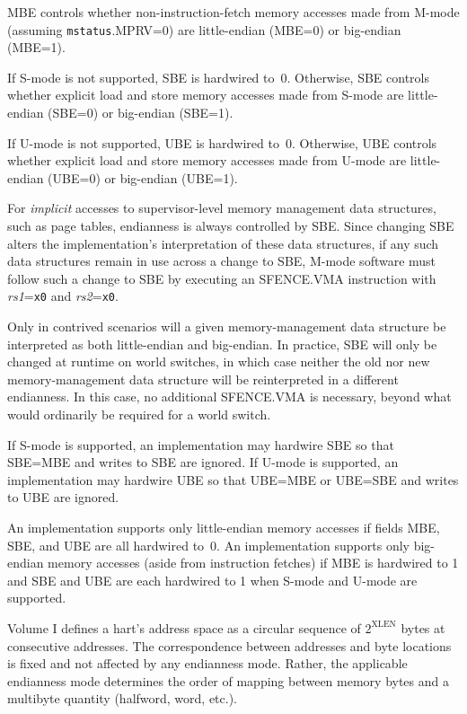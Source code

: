 MBE controls whether non-instruction-fetch memory accesses made from
M-mode (assuming {\tt mstatus}.MPRV=0) are little-endian (MBE=0) or
big-endian (MBE=1).

If S-mode is not supported, SBE is hardwired to~0.
Otherwise, SBE controls whether explicit load and store memory accesses made
from S-mode are little-endian (SBE=0) or big-endian (SBE=1).

If U-mode is not supported, UBE is hardwired to~0.
Otherwise, UBE controls whether explicit load and store memory accesses made
from U-mode are little-endian (UBE=0) or big-endian (UBE=1).

For {\em implicit} accesses to supervisor-level memory management data
structures, such as page tables, endianness is always controlled by SBE.
Since changing SBE alters the implementation's interpretation of these data
structures, if any such data structures remain in use across a change to SBE,
M-mode software must follow such a change to SBE by executing an
SFENCE.VMA instruction with {\em rs1}={\tt x0} and {\em rs2}={\tt x0}.

\begin{commentary}
Only in contrived scenarios will a given memory-management data structure be
interpreted as both little-endian and big-endian.
In practice, SBE will only be changed at runtime on world switches, in which
case neither the old nor new memory-management data structure will be
reinterpreted in a different endianness.
In this case, no additional SFENCE.VMA is necessary, beyond what would
ordinarily be required for a world switch.
\end{commentary}

If S-mode is supported, an implementation may hardwire SBE so that
SBE=MBE and writes to SBE are ignored.
If U-mode is supported, an implementation may hardwire UBE so that
UBE=MBE or UBE=SBE and writes to UBE are ignored.

\begin{commentary}
An implementation supports only little-endian memory accesses if fields
MBE, SBE, and UBE are all hardwired to~0.
An implementation supports only big-endian memory accesses (aside from
instruction fetches) if MBE is hardwired to 1 and SBE and UBE are each
hardwired to 1 when S-mode and U-mode are supported.
\end{commentary}

\begin{commentary}
Volume I defines a hart's address space as a circular sequence of
$2^{\text{XLEN}}$ bytes at consecutive addresses.
The correspondence between addresses and byte locations is fixed and not
affected by any endianness mode.
Rather, the applicable endianness mode determines the order of mapping
between memory bytes and a multibyte quantity (halfword, word, etc.).
\end{commentary}


